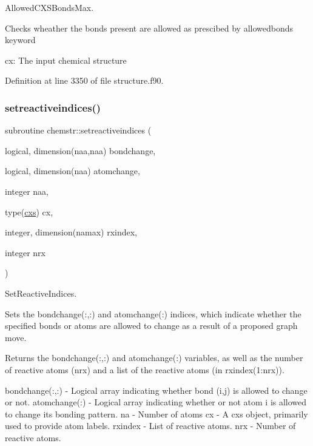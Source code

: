 Allowed\+C\+X\+S\+Bonds\+Max. 

Checks wheather the bonds present are allowed as prescibed by allowedbonds keyword


\begin{DoxyItemize}
\item cx\+: The input chemical structure 
\end{DoxyItemize}

Definition at line 3350 of file structure.\+f90.

\mbox{\label{namespacechemstr_a33a9d23a89f4fc1c8d91dceac19c6e32}} 
\subsubsection{\texorpdfstring{setreactiveindices()}{setreactiveindices()}}
{\footnotesize\ttfamily subroutine chemstr\+::setreactiveindices (\begin{DoxyParamCaption}\item[{logical, dimension(naa,naa)}]{bondchange,  }\item[{logical, dimension(naa)}]{atomchange,  }\item[{integer}]{naa,  }\item[{type(\mbox{\hyperlink{structchemstr_1_1cxs}{cxs}})}]{cx,  }\item[{integer, dimension(namax)}]{rxindex,  }\item[{integer}]{nrx }\end{DoxyParamCaption})}



Set\+Reactive\+Indices. 

Sets the bondchange(\+:,\+:) and atomchange(\+:) indices, which indicate whether the specified bonds or atoms are allowed to change as a result of a proposed graph move.

Returns the bondchange(\+:,\+:) and atomchange(\+:) variables, as well as the number of reactive atoms (nrx) and a list of the reactive atoms (in rxindex(1\+:nrx)).

bondchange(\+:,\+:) -\/ Logical array indicating whether bond (i,j) is allowed to change or not. atomchange(\+:) -\/ Logical array indicating whether or not atom i is allowed to change its bonding pattern. na -\/ Number of atoms cx -\/ A cxs object, primarily used to provide atom labels. rxindex -\/ List of reactive atoms. nrx -\/ Number of reactive atoms. 

